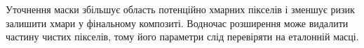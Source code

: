 \clearpage
\chapterConclusion Уточнення маски збільшує область %
потенційно хмарних пікселів і
зменшує ризик залишити хмари у фінальному %
композиті. Водночас розширення може видалити
частину чистих пікселів, тому його параметри %
слід перевіряти на еталонній масці.
